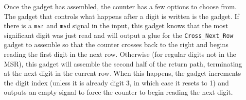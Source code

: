 \subsubsection{ \nextread }

Once the {\returnpath} gadget has assembled, the counter has a few options to choose from.
%
The gadget that controls what happens after a digit is written is the {\nextread} gadget.
%
If there is a {\tt msr} and {\tt msd} signal in the input, this gadget knows that the most significant digit was just read and will output a
glue for the {\tt Cross\_Next\_Row} gadget to assemble so that the counter crosses
back to the right and begins reading the first digit in the next row.
%
Otherwise (for regular digits not in the MSR), this gadget will assemble the second half of
the return path, terminating at the next digit in the current row.
%
When this happens, the gadget increments the digit index (unless it is already digit 3, in which case it
resets to 1) and outputs an empty {\cread} signal to force the counter to begin reading
the next digit.



